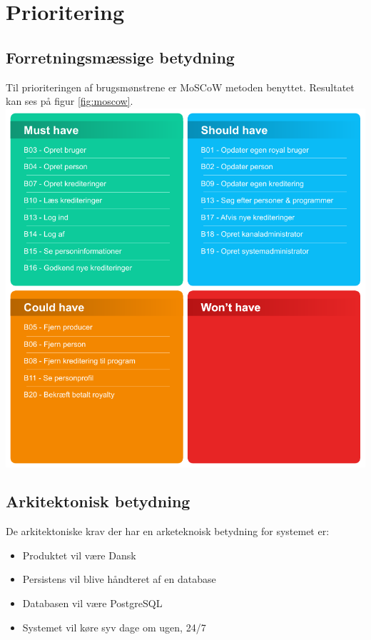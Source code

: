 \section{Prioritering}
\subsection{Forretningsmæssige betydning}
\noindent
Til prioriteringen af brugsmønstrene er MoSCoW metoden benyttet. Resultatet kan ses på figur \ref{fig:moscow}.\\

\includegraphics[scale=1]{figures/MoSCoW.pdf}
\label{fig:moscow}

\subsection{Arkitektonisk betydning}
De arkitektoniske krav der har en arketeknoisk betydning for systemet er:
\begin{itemize}
    \item Produktet vil være Dansk
    \item Persistens vil blive håndteret af en database
    \item Databasen vil være PostgreSQL
    \item Systemet vil køre syv dage om ugen, 24/7
\end{itemize}



